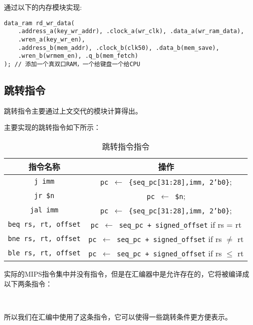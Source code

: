 \songti
通过以下的内存模块实现:
\begin{lstlisting}[style = verilog-style, caption = {数据RAM的访问存储}]
data_ram rd_wr_data(
	.address_a(key_wr_addr), .clock_a(wr_clk), .data_a(wr_ram_data),
	.wren_a(key_wr_en), 
	.address_b(mem_addr), .clock_b(clk50), .data_b(mem_save),
	.wren_b(wrmem_en), .q_b(mem_fetch)
); // 添加一个真双口RAM，一个给键盘一个给CPU
\end{lstlisting}
\subsection{跳转指令}
\hspace*{9mm}跳转指令主要通过上文交代的模块计算得出。

主要实现的跳转指令如下所示：

\begin{table}[htbp]
	\centering
	\caption{跳转指令指令}
	\renewcommand\arraystretch{1.5}
	\kaishu
	\begin{tabular}{cc}  
		\toprule[1pt]  
		\rowcolor[gray]{0.9}   指令名称 & 操作\\  
		\midrule  
		\texttt{j imm} & \texttt{pc $\gets$ \{seq\_pc[31:28],imm, 2'b0\}};\\
		\texttt{jr \$n} & \texttt{pc $\gets$ \$n};\\
		\texttt{jal imm} & \texttt{pc $\gets$ \{seq\_pc[31:28],imm, 2'b0\}};\\
		\texttt{beq rs, rt, offset} & \texttt{pc $\gets$ seq\_pc + signed\_offset} if rs = rt\\
		\texttt{bne rs, rt, offset} & \texttt{pc $\gets$ seq\_pc + signed\_offset} if rs $\neq$ rt\\
		\texttt{ble rs, rt, offset} & \texttt{pc $\gets$ seq\_pc + signed\_offset} if rs $\leq$ rt\\
		\bottomrule[1pt]  
		\end{tabular} 
\end{table}

\songti
实际的MIPS指令集中并没有指令，但是在汇编器中是允许存在的，它将被编译成以下两条指令：

\begin{center}
\\
\end{center}

所以我们在汇编中使用了这条指令，它可以使得一些跳转条件更方便表示。

